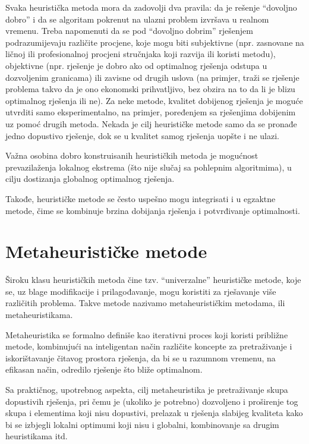 \documentclass[a4paper, utf8, 11pt, colorlinks]{book}
\begin{document}
 
 Svaka heuristička metoda mora da zadovolji dva pravila: da je rešenje ``dovoljno
 dobro'' i da se algoritam pokrenut na ulazni problem izvršava u realnom vremenu. Treba napomenuti da se pod  ``dovoljno
 dobrim'' rješenjem podrazumijevaju različite procjene, koje mogu biti subjektivne (npr. zasnovane na ličnoj ili profesionalnoj procjeni stručnjaka koji razvija ili koristi metodu), objektivne (npr.  rješenje je dobro ako od optimalnog rješenja odstupa u dozvoljenim granicama) ili zavisne od drugih uslova (na primjer, traži se rješenje problema takvo da je ono ekonomski prihvatljivo, bez obzira na to da li je blizu optimalnog rješenja ili ne). 
 Za neke metode, kvalitet dobijenog rješenja je moguće utvrditi samo eksperimentalno, na primjer, poređenjem sa rješenjima dobijenim uz pomoć drugih metoda. Nekada je cilj heurističke metode samo da se pronađe jedno dopustivo rješenje, dok se u kvalitet samog rješenja uopšte i ne ulazi.
 
 Važna osobina dobro konstruisanih heurističkih metoda je mogućnost prevazilaženja lokalnog ekstrema (što nije slučaj sa pohlepnim algoritmima), u cilju dostizanja globalnog optimalnog rješenja. 
 
 Takođe, heurističke metode se često uspešno mogu integrisati i u egzaktne metode, čime se kombinuje brzina dobijanja rješenja i potvrđivanje optimalnosti.
 
 \section{Metaheurističke metode}
 
 Široku klasu heurističkih metoda čine tzv. ``univerzalne'' heurističke metode, koje se, uz blage modifikacije i prilagođavanje, mogu koristiti za rješavanje više različitih problema. Takve metode nazivamo metaheurističkim metodama, ili metaheuristikama.  
 
 Metaheuristika se formalno definiše kao iterativni proces koji koristi približne metode, kombinujući na inteligentan način različite koncepte za pretraživanje i iskorištavanje čitavog prostora rješenja, da bi se u razumnom vremenu, na efikasan način, odredilo rješenje što bliže optimalnom.
 
 Sa praktičnog, upotrebnog aspekta, cilj metaheuristika je pretraživanje skupa dopustivih rješenja, pri čemu je (ukoliko je potrebno) dozvoljeno i proširenje tog skupa i elementima koji nisu dopustivi, prelazak u rješenja slabijeg kvali\-teta kako bi se izbjegli lokalni optimumi koji nisu i globalni, kombinovanje sa drugim heuristikama itd.
\end{document}
